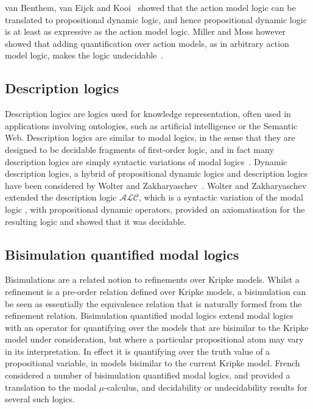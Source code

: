 van Benthem, van Eijck and Kooi~\cite{vanbenthem2006logics} showed that the
action model logic can be translated to propositional dynamic logic, and hence
propositional dynamic logic is at least as expressive as the action model logic.
Miller and Moss however showed that adding quantification over action models, as
in arbitrary action model logic, makes the logic
undecidable~\cite{miller2005undecidability}.

\subsection{Description logics}

Description logics are logics used for knowledge representation, often used in
applications involving ontologies, such as artificial intelligence or the
Semantic Web. Description logics are similar to modal logics, in the sense that
they are designed to be decidable fragments of first-order logic, and in fact
many description logics are simply syntactic variations of modal
logics~\cite{blackburn2002modal}. Dynamic description logics, a hybrid of
propositional dynamic logics and description logics have been considered by
Wolter and Zakharyaschev~\cite{wolter1998dynamic}. Wolter and Zakharyaschev
extended the description logic $\mathcal{ALC}$, which is a syntactic variation of
the modal logic \logicK{}, with propositional dynamic operators, provided an
axiomatisation for the resulting logic and showed that it was decidable.

\subsection{Bisimulation quantified modal logics}

Bisimulations are a related notion to refinements over Kripke models. Whilst a
refinement is a pre-order relation defined over Kripke models, a bisimulation
can be seen as essentially the equivalence relation that is naturally formed
from the refinement relation. Bisimulation quantified modal logics extend modal
logics with an operator for quantifying over the models that are bisimilar to
the Kripke model under consideration, but where a particular propositional atom
may vary in its interpretation. In effect it is quantifying over the truth value
of a propositional variable, in models bisimilar to the current Kripke model.
French~\cite{french2006bisimulation} considered a number of bisimulation
quantified modal logics, and provided a translation to the modal
$\mu$-calculus, and decidability or undecidability results for several such
logics.

